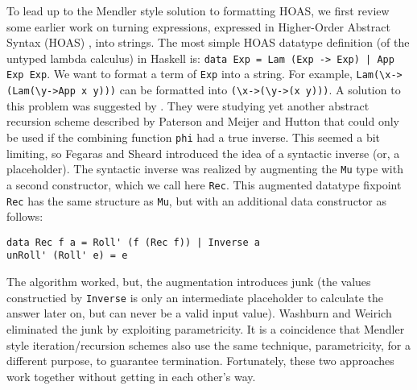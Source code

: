 To lead up to the Mendler style solution to formatting HOAS,
we first review some earlier work on turning expressions, expressed in 
Higher-Order Abstract Syntax (HOAS) \cite{Church40,PfeEll88}, into strings.
The most simple HOAS datatype definition (of the untyped lambda calculus)
in Haskell is:
\verb/data Exp = Lam (Exp -> Exp) | App Exp Exp/.
We want to format a term of \texttt{Exp} into a string.
For example, \verb|Lam(\x->(Lam(\y->App x y)))| can be
formatted into \verb|(\x->(\y->(x y)))|.
A solution to this problem was suggested by \citet{FegShe96}.
They were studying yet another abstract recursion scheme described by
Paterson \cite{Pat93} and Meijer and Hutton \cite{MeiHut95} that could only be
used if the combining function \texttt{phi} had a true inverse.
This seemed a bit limiting, so Fegaras and Sheard introduced the idea of
a syntactic inverse (or, a placeholder). The syntactic inverse was realized by
augmenting the \verb|Mu| type with a second constructor, which we call here
\verb|Rec|. This augmented datatype fixpoint \verb|Rec| has the same structure
as \verb|Mu|, but with an additional data constructor as follows:
\begin{verbatim}
data Rec f a = Roll' (f (Rec f)) | Inverse a
unRoll' (Roll' e) = e
\end{verbatim}
The algorithm worked, but, the augmentation introduces junk (\ie the values
constructied by \texttt{Inverse} is only an intermediate placeholder to
calculate the answer later on, but can never be a valid input value).
Washburn and Weirich\cite{bgb} eliminated the junk by exploiting parametricity.
It is a coincidence that Mendler style iteration/recursion schemes also use
the same technique, parametricity, for a different purpose, to guarantee
termination. Fortunately, these two approaches work together without getting in
each other's way.  

